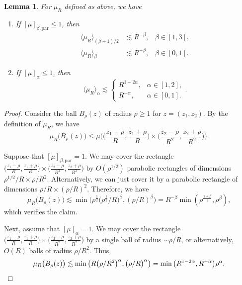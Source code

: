 \documentclass[11pt]{amsart}
\newtheorem{lemma}[theorem]{Lemma}
\theoremstyle{definition}
\theoremstyle{remark}
\newcommand{\les}{\lesssim}
\newcommand{\inn}[1]{\langle  #1 \rangle}
\begin{document}
\begin{lemma}\label{lem:measure} For $\mu_R$ defined as above, we have 
\vspace{-.2cm}
	\begin{enumerate}
    	\item If $[\mu]_{\beta,\text{par}}\le 1$, then 
		\begin{align*}
			\inn{\mu_R}_{(\beta+1)/2} &\les R^{-\beta},  \;\;\;  \beta \in [1,3], \\
			\inn{\mu_R}_{\beta} &\les R^{-\beta}, \;\;\; \beta\in[0,1].
		\end{align*}
		\item If $[\mu]_{\alpha}\le 1$, then 
		\[ \inn{\mu_R}_{\alpha}  \les   \begin{cases}
								R^{1-2\alpha},  & \alpha \in [1,2],\\
			R^{-\alpha},  & \alpha \in [0,1].
		\end{cases}. \]
	\end{enumerate}
\end{lemma}
\begin{proof}
Consider the ball $B_\rho(z)$ of radius $\rho\geq 1$ for $z=(z_1,z_2)$.
By the definition of $\mu_R$, we have  
\[
\mu_R\big(B_\rho(z)\big) \leq \mu\Big( \big(\frac{z_1-\rho}R,\frac{z_1+\rho}{R}\big)\times \big(\frac{z_2-\rho}{R^2},\frac{z_2+\rho}{R^2}\big)
\Big).
\]

Suppose that $[\mu]_{\beta,\text{par}}=1$. 
We may cover the rectangle 
$\big(\frac{z_1-\rho}R,\frac{z_1+\rho}{R}\big)\times \big(\frac{z_2-\rho}{R^2},\frac{z_2+\rho}{R^2}\big)$
by $O(\rho^{1/2})$ parabolic rectangles of dimensions $\rho^{1/2}/R \times \rho/R^2$. Alternatively, we can just cover it by a parabolic rectangle of dimensions $\rho/R \times (\rho/R)^2$. Therefore, we have 
\[ 
   \mu_R\big(B_\rho(z)\big) \les \min\big( \rho^{\frac12} \big(\rho^{\frac12}/R\big)^{\beta}, (\rho/R)^\beta \big) = R^{-\beta} \min( \rho^{\frac{1+\beta}2},\rho^\beta),
\]
which verifies the claim. 

Next, assume that $[\mu]_{\alpha}=1$. We may cover the rectangle $\big(\frac{z_1-\rho}R,\frac{z_1+\rho}{R}\big)\times \big(\frac{z_2-\rho}{R^2},\frac{z_2+\rho}{R^2}\big)$
by a single ball of radius $\sim \rho/R$, or alternatively, $O(R)$ balls of radius $\rho/R^2$. Thus, 
\[ 
   \mu_R\big(B_\rho(z)\big) \les \min\big( R \big(\rho/R^2\big)^\alpha , \big(\rho/R\big)^\alpha\big)  = \min\big( R^{1-2\alpha}, R^{-\alpha}\big) \rho^\alpha. \qedhere
\]
\end{proof}
\end{document}

